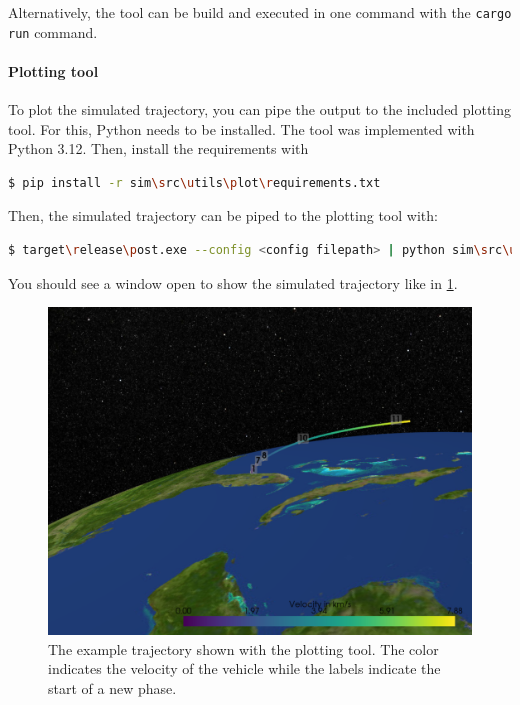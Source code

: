 Alternatively, the tool can be build and executed in one command with the \lstinline{cargo run} command.

\paragraph{Plotting tool}

To plot the simulated trajectory, you can pipe the output to the included
plotting tool. For this, Python needs to be installed. The tool was
implemented with Python 3.12. Then, install the requirements with
\begin{lstlisting}[language=sh]
 $ pip install -r sim\src\utils\plot\requirements.txt
\end{lstlisting}

Then, the simulated trajectory can be piped to the plotting tool with:
\begin{lstlisting}[language=sh]
 $ target\release\post.exe --config <config filepath> | python sim\src\utils\plot\plot.py
\end{lstlisting}

You should see a window open to show the simulated trajectory like in \cref{example-plot}.

\begin{figure}[!ht]
  \centering
  \includegraphics[width=\textwidth]{images/example-plot.png}
  \caption{The example trajectory shown with the plotting tool. The color
    indicates the velocity of the vehicle while the labels indicate the start of a
    new phase.}
  \label{example-plot}
\end{figure}

